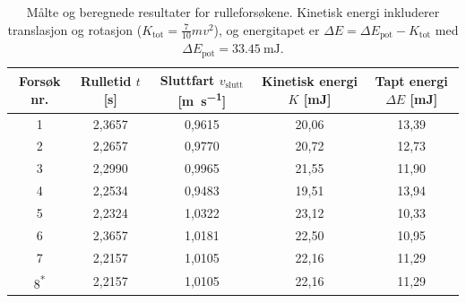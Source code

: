 \documentclass[11pt,a4paper]{article}
\begin{document}
\begin{table}[htbp]
    \centering
    \caption{Målte og beregnede resultater for rulleforsøkene. Kinetisk energi inkluderer translasjon og rotasjon ($K_{\text{tot}} = \frac{7}{10}mv^2$), og energitapet er $\Delta E = \Delta E_{\text{pot}} - K_{\text{tot}}$ med $\Delta E_{\text{pot}} = \SI{33,45}{\milli\joule}$.}
    \label{tab:forsok}
    \begin{tabular}{@{}ccccc@{}}
        \toprule
        \textbf{Forsøk nr.} & \textbf{Rulletid $t$ [\si{\second}]} & \textbf{Sluttfart $v_{\text{slutt}}$ [\si{\meter\per\second}]} & \textbf{Kinetisk energi $K$ [\si{\milli\joule}]} & \textbf{Tapt energi $\Delta E$ [\si{\milli\joule}]} \\ \midrule
        1 & 2,3657 & 0,9615 & 20,06 & 13,39 \\
        2 & 2,2657 & 0,9770 & 20,72 & 12,73 \\
        3 & 2,2990 & 0,9965 & 21,55 & 11,90 \\
        4 & 2,2534 & 0,9483 & 19,51 & 13,94 \\
        5 & 2,2324 & 1,0322 & 23,12 & 10,33 \\
        6 & 2,3657 & 1,0181 & 22,50 & 10,95 \\
        7 & 2,2157 & 1,0105 & 22,16 & 11,29 \\
        8\textsuperscript{*} & 2,2157 & 1,0105 & 22,16 & 11,29 \\ \bottomrule
    \end{tabular}
    \vspace{0.15cm}
\end{table}
\end{document}
